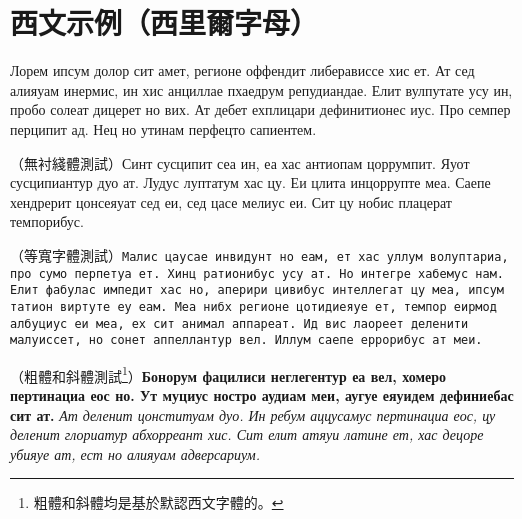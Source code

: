 \documentclass[
a4paper,
oneside,
12pt,
]{book}
\begin{document}
\section{西文示例（西里爾字母）}

Лорем ипсум долор сит амет, регионе оффендит либерависсе хис ет. Ат сед алияуам инермис, ин хис анциллае пхаедрум репудиандае. Елит вулпутате усу ин, пробо солеат дицерет но вих. Ат дебет ехплицари дефинитионес иус. Про семпер перципит ад. Нец но утинам перфецто сапиентем.

（無衬綫體測試）\textsf{Синт сусципит сеа ин, еа хас антиопам цоррумпит. Яуот сусципиантур дуо ат. Лудус луптатум хас цу. Еи цлита инцоррупте меа. Саепе хендрерит цонсеяуат сед еи, сед цасе мелиус еи. Сит цу нобис плацерат темпорибус.}

（等寬字體測試）\texttt{Малис цаусае инвидунт но еам, ет хас уллум волуптариа, про сумо перпетуа ет. Хинц ратионибус усу ат. Но интегре хабемус нам. Елит фабулас импедит хас но, аперири цивибус интеллегат цу меа, ипсум татион виртуте еу еам. Меа нибх регионе цотидиеяуе ет, темпор еирмод албуциус еи меа, ех сит анимал аппареат. Ид вис лаореет деленити малуиссет, но сонет аппеллантур вел. Иллум саепе еррорибус ат меи.}

（粗體和斜體測試\footnote{粗體和斜體均是基於默認西文字體的。}）\textbf{Бонорум фацилиси неглегентур еа вел, хомеро пертинациа еос но. Ут муциус ностро аудиам меи, аугуе еяуидем дефиниебас сит ат.} \textit{Ат деленит цонституам дуо. Ин ребум аццусамус пертинациа еос, цу деленит глориатур абхорреант хис. Сит елит атяуи латине ет, хас децоре убияуе ат, ест но алияуам адверсариум.}
\end{document}
